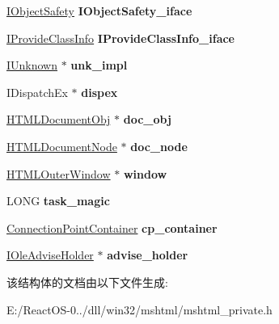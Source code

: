 \begin{DoxyCompactItemize}
\hyperlink{interface_i_object_safety}{I\+Object\+Safety} {\bfseries I\+Object\+Safety\+\_\+iface}
\item 
\mbox{\label{struct_h_t_m_l_document_a724216978b4537cb5c05adb9008f9250}} 
\hyperlink{interface_i_provide_class_info}{I\+Provide\+Class\+Info} {\bfseries I\+Provide\+Class\+Info\+\_\+iface}
\item 
\mbox{\label{struct_h_t_m_l_document_a442c9856e00d2ed38a8a4a2d3d51eb39}} 
\hyperlink{interface_i_unknown}{I\+Unknown} $\ast$ {\bfseries unk\+\_\+impl}
\item 
\mbox{\label{struct_h_t_m_l_document_af5e3a4d5c0303aa3b2c772cd94f59d1f}} 
I\+Dispatch\+Ex $\ast$ {\bfseries dispex}
\item 
\mbox{\label{struct_h_t_m_l_document_ad726f04440b515f99eb089372df5f645}} 
\hyperlink{struct_h_t_m_l_document_obj}{H\+T\+M\+L\+Document\+Obj} $\ast$ {\bfseries doc\+\_\+obj}
\item 
\mbox{\label{struct_h_t_m_l_document_aa255742d5868cf4f4b2715555ec53b3d}} 
\hyperlink{struct_h_t_m_l_document_node}{H\+T\+M\+L\+Document\+Node} $\ast$ {\bfseries doc\+\_\+node}
\item 
\mbox{\label{struct_h_t_m_l_document_a17007952a60a8e66ac0954e75a2a4b0f}} 
\hyperlink{struct_h_t_m_l_outer_window}{H\+T\+M\+L\+Outer\+Window} $\ast$ {\bfseries window}
\item 
\mbox{\label{struct_h_t_m_l_document_afbe5bc4f778c402116008271b681852f}} 
L\+O\+NG {\bfseries task\+\_\+magic}
\item 
\mbox{\label{struct_h_t_m_l_document_aa5d496d86f101295a8840e21a76b7532}} 
\hyperlink{struct_connection_point_container}{Connection\+Point\+Container} {\bfseries cp\+\_\+container}
\item 
\mbox{\label{struct_h_t_m_l_document_ab323dae745ff490b2f3182631237512a}} 
\hyperlink{interface_i_ole_advise_holder}{I\+Ole\+Advise\+Holder} $\ast$ {\bfseries advise\+\_\+holder}
\end{DoxyCompactItemize}


该结构体的文档由以下文件生成\+:\begin{DoxyCompactItemize}
\item 
E\+:/\+React\+O\+S-\/0../dll/win32/mshtml/mshtml\+\_\+private.\+h\end{DoxyCompactItemize}
